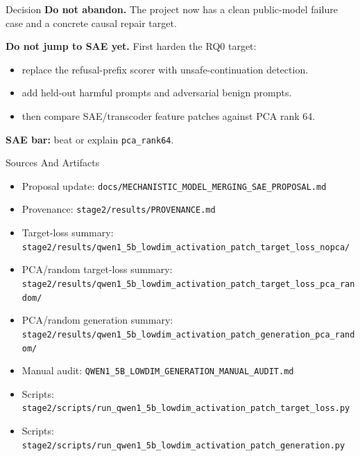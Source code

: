 \documentclass[aspectratio=169]{beamer}
\begin{document}
\begin{frame}{Decision}
  \textbf{Do not abandon.} The project now has a clean public-model failure case and a concrete causal repair target.

  \vspace{0.35cm}
  \textbf{Do not jump to SAE yet.} First harden the RQ0 target:
  \begin{itemize}
    \item replace the refusal-prefix scorer with unsafe-continuation detection.
    \item add held-out harmful prompts and adversarial benign prompts.
    \item then compare SAE/transcoder feature patches against PCA rank 64.
  \end{itemize}

  \vspace{0.2cm}
  \textbf{SAE bar:} beat or explain \texttt{pca\_rank64}.
\end{frame}

\begin{frame}{Sources And Artifacts}
  \small
  \begin{itemize}
    \item Proposal update: \texttt{docs/MECHANISTIC\_MODEL\_MERGING\_SAE\_PROPOSAL.md}
    \item Provenance: \texttt{stage2/results/PROVENANCE.md}
    \item Target-loss summary: \texttt{stage2/results/qwen1\_5b\_lowdim\_activation\_patch\_target\_loss\_nopca/}
    \item PCA/random target-loss summary: \texttt{stage2/results/qwen1\_5b\_lowdim\_activation\_patch\_target\_loss\_pca\_random/}
    \item PCA/random generation summary: \texttt{stage2/results/qwen1\_5b\_lowdim\_activation\_patch\_generation\_pca\_random/}
    \item Manual audit: \texttt{QWEN1\_5B\_LOWDIM\_GENERATION\_MANUAL\_AUDIT.md}
    \item Scripts: \texttt{stage2/scripts/run\_qwen1\_5b\_lowdim\_activation\_patch\_target\_loss.py}
    \item Scripts: \texttt{stage2/scripts/run\_qwen1\_5b\_lowdim\_activation\_patch\_generation.py}
  \end{itemize}
\end{frame}
\end{document}
